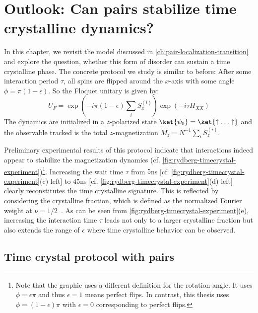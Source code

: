 \chapter{Outlook: Can pairs stabilize time crystalline dynamics?}
\label{ch:rydberg-timecrystal}
In this chapter, we revisit the model discussed in \autoref{ch:pair-localization-transition} and explore the question, whether this form of disorder can sustain a time crystalline phase. The concrete protocol we study is similar to before: After some interaction period $\tau$, all spins are flipped around the $x$-axis with some angle $\phi=\pi(1-\epsilon)$. So the Floquet unitary is given by:
\begin{equation}
	U_F = \exp(-i\pi(1-\epsilon)\sum_i S_x^{(i)})\exp(-i\tau H_{XX})
\end{equation}
The dynamics are initialized in a $z$-polarized state $\ket{\psi_0} = \ket{\uparrow\ldots\uparrow}$ and the observable tracked is the total $z$-magnetization $M_z = N^{-1} \sum_i S_z^{(i)}$.

Preliminary experimental results of this protocol indicate that interactions indeed appear to stabilize the magnetization dynamics (cf. \autoref{fig:rydberg-timecrystal-experiment})\footnote{Note that the graphic uses a different definition for the rotation angle. It uses $\phi=\epsilon \pi$ and thus $\epsilon = 1$ means perfect flips. In contrast, this thesis uses $\phi=(1-\epsilon)\pi$ with $\epsilon=0$ corresponding to perfect flips.}. Increasing the wait time $\tau$ from $5$ns [cf. \autoref{fig:rydberg-timecrystal-experiment}(c) left] to $45$ns [cf. \autoref{fig:rydberg-timecrystal-experiment}(d) left] clearly reconstitutes the time crystalline signature. This is reflected by considering the crystalline fraction, which is defined as the normalized Fourier weight at $\nu=1/2$~\cite{choiObservationDiscreteTimecrystalline2017}. As can be seen from \autoref{fig:rydberg-timecrystal-experiment}(e), increasing the interaction time $\tau$ leads not only to a larger crystalline fraction but also extends the range of $\epsilon$ where time crystalline behavior can be observed.

\section{Time crystal protocol with pairs}

